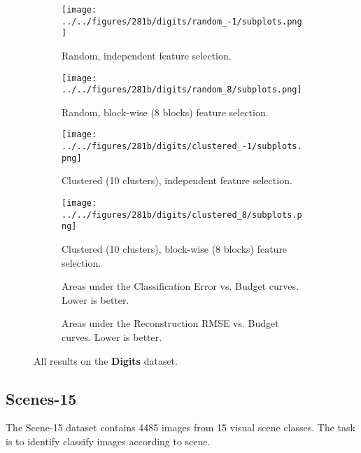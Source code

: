 \begin{figure}[ht!]
    \centering
    \begin{subfigure}[b]{\textwidth}
        \centering
        \texttt{[image: ../../figures/281b/digits/random\_-1/subplots.png]}
        \caption{Random, independent feature selection.\vspace{.2cm}}
    \end{subfigure}
    \begin{subfigure}[b]{\textwidth}
        \centering
        \texttt{[image: ../../figures/281b/digits/random\_8/subplots.png]}
        \caption{Random, block-wise (8 blocks) feature selection.\vspace{.2cm}}
    \end{subfigure}
    \begin{subfigure}[b]{\textwidth}
        \centering
        \texttt{[image: ../../figures/281b/digits/clustered\_-1/subplots.png]}
        \caption{Clustered (10 clusters), independent feature selection.\vspace{.2cm}}
    \end{subfigure}
    \begin{subfigure}[b]{\textwidth}
        \centering
        \texttt{[image: ../../figures/281b/digits/clustered\_8/subplots.png]}
        \caption{Clustered (10 clusters), block-wise (8 blocks) feature selection.\vspace{.2cm}}
    \end{subfigure}

    \small{
    \begin{subfigure}[b]{1\textwidth}
        \centering
        
        \caption{Areas under the Classification Error vs. Budget curves. Lower is better.}
    \end{subfigure}
    \begin{subfigure}[b]{1\textwidth}
        \centering
        
        \caption{Areas under the Reconstruction RMSE vs. Budget curves. Lower is better.}
    \end{subfigure}
    }
    \caption{All results on the \textbf{Digits} dataset.}
    \label{fig:digits}
\end{figure}

\subsection{Scenes-15}
The Scene-15 dataset \cite{Lazebnik-CVPR-2006} contains 4485 images from 15 visual scene classes.
The task is to identify classify images according to scene.

